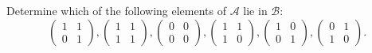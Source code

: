  Determine which of the following elements of
$\mathcal{A}$ lie in $\mathcal{B}$:
\begin{equation*}
  \begin{pmatrix}
    1 & 1\\
    0 & 1
  \end{pmatrix},
  \begin{pmatrix}
    1 & 1\\
    1 & 1
  \end{pmatrix},
  \begin{pmatrix}
    0 & 0\\
    0 & 0
  \end{pmatrix},
  \begin{pmatrix}
    1 & 1\\
    1 & 0
  \end{pmatrix},
  \begin{pmatrix}
    1 & 0\\
    0 & 1
  \end{pmatrix},
  \begin{pmatrix}
    0 & 1\\
    1 & 0
  \end{pmatrix}.
\end{equation*}
